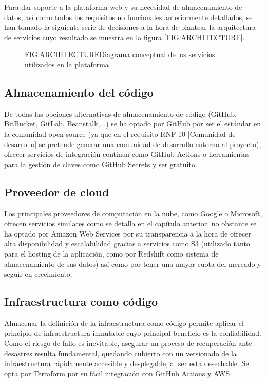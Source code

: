 
Para dar soporte a la plataforma web y su necesidad de almacenamiento de datos, así como todos los requisitos no funcionales anteriormente detallados, se han tomado la siguiente serie de decisiones a la hora de plantear la arquitectura de servicios cuyo resultado se muestra en la figura \ref{FIG:ARCHITECTURE}.

\begin{figure}[]{FIG:ARCHITECTURE}{Diagrama conceptual de los servicios utilizados en la plataforma}
\end{figure}

\subsection{Almacenamiento del código}

De todas las opciones alternativas de almacenamiento de código (GitHub, BitBucket, GitLab, Beanstalk,...) se ha optado por GitHub por ser el estándar en la comunidad open source (ya que en el requisito RNF-10 [Comunidad de desarrollo] se pretende generar una comunidad de desarrollo entorno al proyecto), ofrecer servicios de integración continua como GitHub Actions o herramientas para la gestión de claves como GitHub Secrets y ser gratuito.

\subsection{Proveedor de cloud}

Los principales proveedores de computación en la nube, como Google o Microsoft, ofrecen servicios similares como se detalla en el capítulo anterior, no obstante se ha optado por Amazon Web Services por su transparencia a la hora de ofrecer alta disponibilidad y escalabilidad gracias a servicios como S3 (utilizado tanto para el hosting de la aplicación, como por Redshift como sistema de almacenamiento de sus datos) así como por tener una mayor cuota del mercado y seguir en crecimiento.

\subsection{Infraestructura como código}

Almacenar la definición de la infraestructura como código permite aplicar el principio de infraestructura inmutable\cite{InfraAsCode} cuyo principal beneficio es la confiabilidad. Como el riesgo de fallo es inevitable, asegurar un proceso de recuperación ante desastres resulta fundamental, quedando cubierto con un versionado de la infraestructura rápidamente accesible y desplegable, al ser esta desechable. Se opta por Terraform por su fácil integración con GitHub Actions y AWS.

